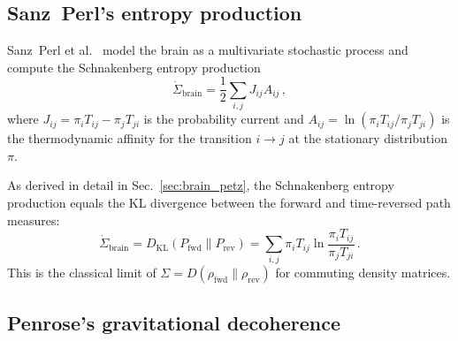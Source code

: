 \documentclass[prl,twocolumn,superscriptaddress,longbibliography,floatfix]{revtex4-2}
\newcommand{\DKL}{D_{\mathrm{KL}}}
\begin{document}
\subsection{Sanz~Perl's entropy production}
\label{subsec:sanzperl}

Sanz~Perl et al.~\cite{SanzPerl2021} model the brain as a
multivariate stochastic process and compute the Schnakenberg entropy
production
\begin{equation}
\dot{\Sigma}_{\mathrm{brain}} = \frac{1}{2}\sum_{i,j}J_{ij}A_{ij}\,,
\label{eq:schnakenberg}
\end{equation}
where $J_{ij} = \pi_i T_{ij} - \pi_j T_{ji}$ is the probability
current and
$A_{ij} = \ln(\pi_i T_{ij}/\pi_j T_{ji})$ is the thermodynamic
affinity for the transition $i\to j$ at the stationary distribution
$\pi$.

As derived in detail in Sec.~\ref{sec:brain_petz}, the Schnakenberg
entropy production equals the KL divergence between the forward and
time-reversed path measures:
\begin{equation}
\dot{\Sigma}_{\mathrm{brain}}
  = \DKL(P_{\mathrm{fwd}}\|P_{\mathrm{rev}})
  = \sum_{i,j}\pi_i T_{ij}
  \ln\frac{\pi_i T_{ij}}{\pi_j T_{ji}}\,.
\label{eq:sigma_path}
\end{equation}
This is the classical limit of
$\Sigma = D(\rho_{\mathrm{fwd}}\|\rho_{\mathrm{rev}})$ for
commuting density matrices.

\subsection{Penrose's gravitational decoherence}
\label{subsec:penrose}
\end{document}
